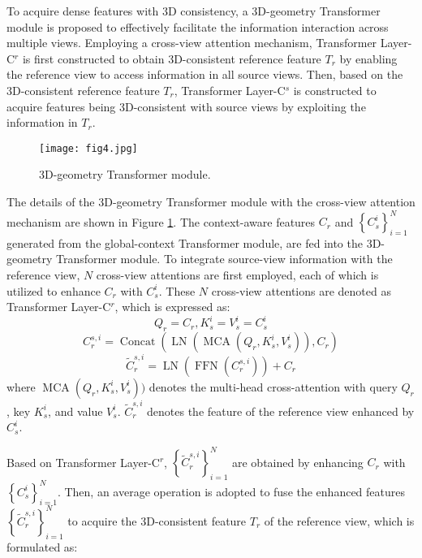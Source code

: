 \documentclass[10pt,twocolumn,letterpaper]{article}
\begin{document}
To acquire dense features with 3D consistency, a 3D-geometry Transformer module is proposed to effectively facilitate the information interaction across multiple views. Employing a cross-view attention mechanism, Transformer Layer-C$^{r}$ is first constructed to obtain 3D-consistent reference feature $T_{r}$ by enabling the reference view to access information in all source views. Then, based on the 3D-consistent reference feature $T_{r}$, Transformer Layer-C$^{s}$ is constructed to acquire features being 3D-consistent with source views by exploiting the information in $T_{r}$.

\begin{figure}[!t]
	\centering
	\texttt{[image: fig4.jpg]}
	\caption{3D-geometry Transformer module.}
	\label{fig.4}
\end{figure}

The details of the 3D-geometry Transformer module with the cross-view attention mechanism are shown in Figure \ref{fig.4}. The context-aware features $C_{r}$ and $\left\{C_{s}^{i}\right\}_{i=1}^{N}$ generated from the global-context Transformer module, are fed into the 3D-geometry Transformer module. To integrate source-view information with the reference view, $N$ cross-view attentions are first employed, each of which is utilized to enhance $C_{r}$ with $C_{s}^{i}$. These $N$ cross-view attentions are denoted as Transformer Layer-C$^{r}$, which is expressed as: 
\begin{equation}
Q_{r}=C_{r}, K_{s}^{i}=V_{s}^{i}=C_{s}^{i}
\label{eq.6}
\end{equation}
\begin{equation}
{C}_{r}^{s, i}=\operatorname{Concat}\left(\operatorname{LN}\left(\operatorname{MCA}\left(Q_{r}, K_{s}^{i}, V_{s}^{i}\right)\right), C_{r}\right)
\label{eq.7}
\end{equation}
\begin{equation}
\widetilde{C}_{r}^{s, i}=\operatorname{LN}\left(\operatorname{FFN}\left(C_{r}^{s, i}\right)\right)+C_{r}
\label{eq.8}
\end{equation}
where $\operatorname{MCA}\left(Q_{r}, K_{s}^{i}, V_{s}^{i}\right))$ denotes the multi-head cross-attention with query $Q_{r}$, key $K_{s}^{i}$, and value $V_{s}^{i}$. $\widetilde{C}_{r}^{s, i}$ denotes the feature of the reference view enhanced by $C_{s}^{i}$.

Based on Transformer Layer-C$^{r}$, $\left\{\widetilde{C}_{r}^{s, i}\right\}_{i=1}^{N}$ are obtained by enhancing $C_{r}$ with $\left\{C_{s}^{i}\right\}_{i=1}^{N}$. Then, an average operation is adopted to fuse the enhanced features $\left\{\widetilde{C}_{r}^{s, i}\right\}_{i=1}^{N}$ to acquire the 3D-consistent feature $T_{r}$ of the reference view, which is formulated as:
\end{document}
